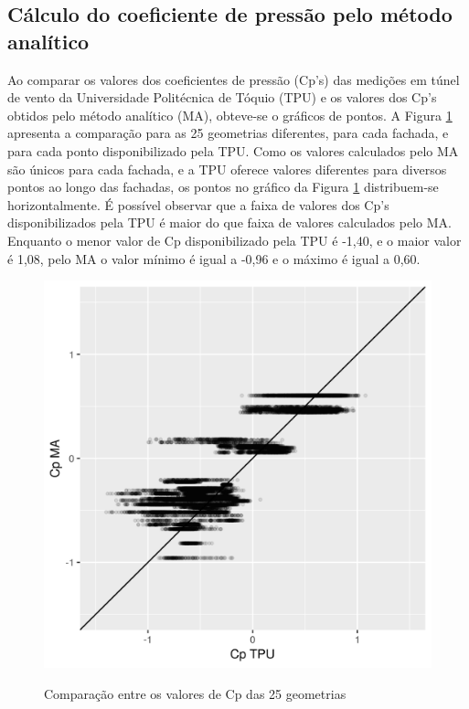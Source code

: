 \documentclass[brazil,hardcopy,openany,a4paper]{ufscthesis}
\begin{document}
		\subsection{Cálculo do coeficiente de pressão pelo método analítico}
		
		Ao comparar os valores dos coeficientes de pressão (Cp’s) das medições em túnel de vento da Universidade Politécnica de Tóquio (TPU) e os valores dos Cp’s obtidos pelo método analítico (MA), obteve-se o gráficos de pontos. 
		A Figura \ref{fig:cp_diff_scatter_all} apresenta a comparação para as 25 geometrias diferentes, para cada fachada, e para cada ponto disponibilizado pela TPU.
		Como os valores calculados pelo MA são únicos para cada fachada, e a TPU oferece valores diferentes para diversos pontos ao longo das fachadas, os pontos no gráfico da Figura \ref{fig:cp_diff_scatter_all} distribuem-se horizontalmente. 
		É possível observar que a faixa de valores dos Cp's disponibilizados pela TPU é maior do que  faixa de valores calculados pelo MA. Enquanto o menor valor de Cp disponibilizado pela TPU é -1,40, e o maior valor é 1,08, pelo MA o valor mínimo é igual a -0,96 e o máximo é igual a 0,60.
		
		\begin{figure}[H]
			\centering
			\caption{Comparação entre os valores de Cp das 25 geometrias}
			\includegraphics[width=1\linewidth]{img/cp_diff_scatter_all.png}
			\label{fig:cp_diff_scatter_all}
		\end{figure}
		
\end{document}
